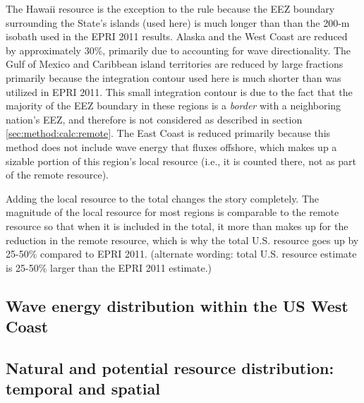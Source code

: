 The Hawaii resource is the exception to the rule because the EEZ boundary surrounding the State's islands (used here) is much longer than than the 200-m isobath used in the EPRI 2011 results.
Alaska and the West Coast are reduced by approximately 30\%, primarily due to accounting for wave directionality.
The Gulf of Mexico and Caribbean island territories are reduced by large fractions primarily because the integration contour used here is much shorter than was utilized in EPRI 2011. This small integration contour is due to the fact that the majority of the EEZ boundary in these regions is a {\it border} with a neighboring nation's EEZ, and therefore is not considered as described in section \ref{sec:method:calc:remote}.
The East Coast is reduced primarily because this method does not include wave energy that fluxes offshore, which makes up a sizable portion of this region's local resource (i.e., it is counted there, not as part of the remote resource).

Adding the local resource to the total changes the story completely. The magnitude of the local resource for most regions is comparable to the remote resource so that when it is included in the total, it more than makes up for the reduction in the remote resource, which is why the total U.S. resource goes up by 25-50\% compared to EPRI 2011. (alternate wording: total U.S. resource estimate is 25-50\% larger than the EPRI 2011 estimate.)


\subsection{Wave energy distribution within the US West Coast}\label{sec:results:wc-dist}
\subsection{Natural and potential resource distribution: temporal and spatial}

